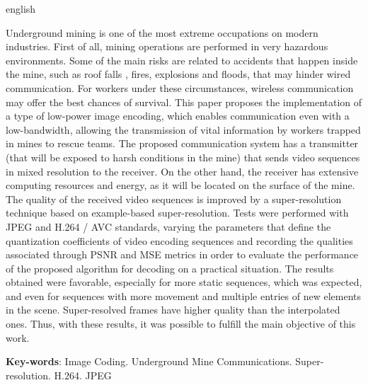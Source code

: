 \begin{resumo}[Abstract]
 \begin{otherlanguage*}{english}

Underground mining is one of the most extreme occupations on modern industries. First of all, mining operations are performed in very hazardous environments. Some of the main risks  are related to accidents that happen inside the mine, such as roof falls , fires, explosions and floods, that may hinder wired communication. For workers under these circumstances, wireless communication may offer the best chances of survival. This paper proposes the implementation of a type of low-power image encoding, which enables communication even with a  low-bandwidth, allowing the transmission of vital information by workers trapped in mines to rescue teams. The proposed communication system has a transmitter (that will be exposed to harsh conditions in the mine) that sends video sequences in mixed resolution to the receiver. On the other hand, the receiver has extensive computing resources and energy, as it will be located on the surface of the mine. The quality of the received video sequences is improved by a super-resolution technique based on example-based super-resolution. Tests were performed with JPEG and H.264 / AVC standards, varying the parameters that define the quantization coefficients of video encoding sequences and recording the qualities associated through PSNR and MSE metrics in order to evaluate the performance of the proposed algorithm for decoding on a practical situation. The results obtained were favorable, especially for more static sequences, which was expected, and even for sequences with more movement and multiple entries of new elements in the scene. Super-resolved frames have higher quality than the interpolated ones. Thus, with these results, it was possible to fulfill the main objective of this work.
 
   \vspace{\onelineskip}
 
   \noindent 
   \textbf{Key-words}: Image Coding. Underground Mine Communications. Super-resolution. H.264. JPEG
    \end{otherlanguage*}
\end{resumo}
